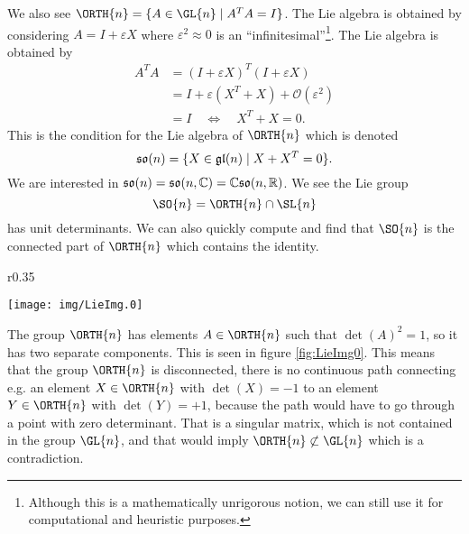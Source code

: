We also see $\ORTH{n}=\{A\in\GL{n}\mid A^{T}A=I\}$. The Lie algebra
is obtained by considering $A=I+\varepsilon X$ where
$\varepsilon^{2}\approx 0$ is an
``infinitesimal''\footnote{Although this is a mathematically
  unrigorous notion, we can still use it for computational and
  heuristic purposes.}. The Lie algebra is obtained by
\begin{subequations}
\begin{align}
A^{T}A &= (I+\varepsilon X)^{T}(I+\varepsilon X)\\
&= I +\varepsilon(X^{T}+X)+\mathcal{O}(\varepsilon^2)\\
&= I\quad\iff\quad X^{T}+X=0.
\end{align}
\end{subequations}
This is the condition for the Lie algebra of $\ORTH{n}$ which is denoted
\begin{equation}
\frak{so}(n)=\{X\in\frak{gl}(n)\mid X+X^{T}=0\}.
\end{equation}
We are interested in
$\frak{so}(n)=\frak{so}(n,\Bbb{C})=\Bbb{C}\frak{so}(n,\Bbb{R})$. We
see the Lie group
\begin{equation}
\SO{n}=\ORTH{n}\cap\SL{n}
\end{equation}
has unit determinants. We can also quickly compute and find that
$\SO{n}$ is the connected part of $\ORTH{n}$ which contains the identity.

\begin{wrapfigure}[12]{r}{0.35\textwidth}
  \vspace{-30pt}
  \begin{center}
    \texttt{[image: img/LieImg.0]}
  \end{center}
  \vspace{-20pt}
  \caption{{\small The Two Separated Components of O$(n)$.}}\label{fig:LieImg0}
  \vspace{20pt}
\end{wrapfigure}

The group $\ORTH{n}$ has elements $A\in\ORTH{n}$ such that
$\det(A)^{2}=1$, so it has two separate components. This is seen
in figure \ref{fig:LieImg0}. This means that the group $\ORTH{n}$ is
disconnected, there is no continuous path connecting e.g. an
element $X\in\ORTH{n}$ with $\det(X)=-1$ to an element $Y\in\ORTH{n}$
with $\det(Y)=+1$, because the path would have to go through a
point with zero determinant. That is a singular matrix, which is
not contained in the group $\GL{n}$, and that would imply
$\ORTH{n}\not\subset\GL{n}$ which is a contradiction.

